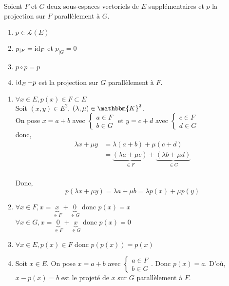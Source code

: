 \begin{prop}
	Soient $F$ et $G$ deux sous-espaces vectoriels de $E$ supplémentaires et $p$ la projection sur $F$ parallèlement à $G$.
	\begin{enumerate}
		\item $p \in \mathcal{L}(E)$
		\item $p_{|F} = \operatorname{id}_F$ et $p_{|G} = 0$
		\item $p \circ p = p$ 
		\item $\operatorname{id}_E - p$ est la projection sur $G$ parallèlement à $F$.
	\end{enumerate}
\end{prop}

\begin{prv}
	\begin{enumerate}
		\item $\forall x \in E, p(x) \in F \subset E$\\
			Soit $(x,y) \in E^2$, $(\lambda, \mu) \in \mathbbm{K}^2$.\\
			On pose $x = a + b$ avec $\begin{cases}
				a \in F\\
				b \in G
			\end{cases}$ et $y = c + d$ avec $\begin{cases}
				c \in F\\
				d \in G
			\end{cases}$ \\
			donc,
			\begin{align*}
				\lambda x + \mu y &= \lambda (a+b) + \mu (c+d) \\
				&= \underbrace{(\lambda a + \mu c)}_{\in F} + \underbrace{(\lambda b + \mu d)}_{\in G} \\
			\end{align*}

			Donc, \[
				p(\lambda x + \mu y) = \lambda a + \mu b  = \lambda p(x) + \mu p(y)
			\] 
		\item $\forall x \in F, x = \underbrace{x}_{\in F} + \underbrace{0}_{\in G}$ donc $p(x) = x$ \\
			$\forall x \in G, x = \underbrace{0}_{\in F} + \underbrace{x}_{\in G}$ donc $p(x) = 0$
		\item $\forall x \in E, p(x) \in F$ donc $p(p(x)) = p(x)$ 
		\item Soit $x \in E$. On pose $x = a + b$ avec $\begin{cases}
			a \in F\\
			b \in G
		\end{cases}$. Donc $p(x) = a$. D'où, $x - p(x) = b$ est le projeté de $x$ sur $G$ parallèlement à $F$.
	\end{enumerate}
\end{prv}

